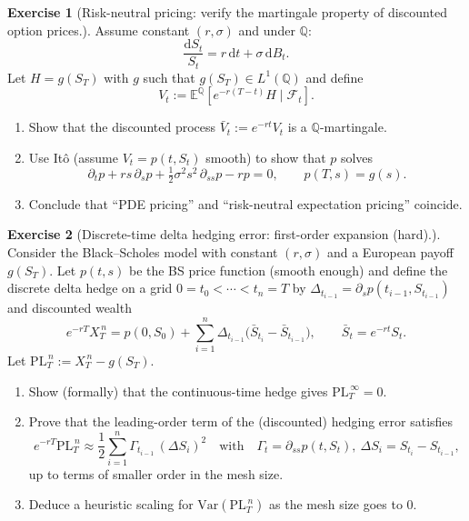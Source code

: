 \documentclass[11pt]{article}
\newcommand{\E}{\mathbb{E}}
\newcommand{\F}{\mathcal{F}}
\newcommand{\1}{\mathbf{1}}
\theoremstyle{definition}
\newtheorem{exercise}{Exercise}[section]
\begin{document}
\begin{exercise}[Risk-neutral pricing: verify the martingale property of discounted option prices.]
Assume constant $(r,\sigma)$ and under $\mathbb{Q}$:
$$
\frac{\mathrm{d} S_t}{S_t}=r\,\mathrm{d} t+\sigma\,\mathrm{d} B_t.
$$
Let $H=g(S_T)$ with $g$ such that $g(S_T)\in L^1(\mathbb{Q})$ and define
$$
V_t:=\E^\mathbb{Q}\!\left[e^{-r(T-t)}H\mid \F_t\right].
$$
\begin{enumerate}[leftmargin=1.2em, label=(\alph*), itemsep=0.3em]
\item Show that the discounted process $\bar V_t:=e^{-rt}V_t$ is a $\mathbb{Q}$-martingale.
\item Use It\^o (assume $V_t=p(t,S_t)$ smooth) to show that $p$ solves
$$
\partial_t p+rs\,\partial_s p+\tfrac12\sigma^2 s^2\,\partial_{ss}p-rp=0,\qquad p(T,s)=g(s).
$$
\item Conclude that ``PDE pricing'' and ``risk-neutral expectation pricing'' coincide.
\end{enumerate}
\end{exercise}
\begin{exercise}[Discrete-time delta hedging error: first-order expansion (hard).]
Consider the Black--Scholes model with constant $(r,\sigma)$ and a European payoff $g(S_T)$.
Let $p(t,s)$ be the BS price function (smooth enough) and define the discrete delta hedge on a grid
$0=t_0<\cdots<t_n=T$ by $\Delta_{t_{i-1}}=\partial_s p(t_{i-1},S_{t_{i-1}})$ and discounted wealth
$$
e^{-rT}X_T^{\,n}=p(0,S_0)+\sum_{i=1}^n \Delta_{t_{i-1}}\big(\bar S_{t_i}-\bar S_{t_{i-1}}\big),
\qquad \bar S_t=e^{-rt}S_t.
$$
Let $\mathrm{PL}_T^{\,n}:=X_T^{\,n}-g(S_T)$.
\begin{enumerate}[leftmargin=1.2em, label=(\alph*), itemsep=0.3em]
\item Show (formally) that the continuous-time hedge gives $\mathrm{PL}_T^{\,\infty}=0$.
\item Prove that the leading-order term of the (discounted) hedging error satisfies
$$
e^{-rT}\mathrm{PL}_T^{\,n}\approx \frac12\sum_{i=1}^n
\Gamma_{t_{i-1}}\,(\Delta S_i)^2
\quad\text{with}\quad
\Gamma_t=\partial_{ss}p(t,S_t),\ \Delta S_i=S_{t_i}-S_{t_{i-1}},
$$
up to terms of smaller order in the mesh size.
\item Deduce a heuristic scaling for $\text{Var}(\mathrm{PL}_T^{\,n})$ as the mesh size goes to $0$.
\end{enumerate}
\end{exercise}
\end{document}
